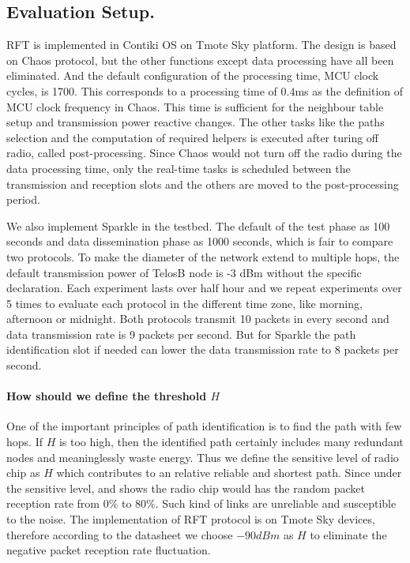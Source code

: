 \documentclass[conference]{IEEEtran}
\begin{document}
\subsection{Evaluation Setup.}
\label{sec:evaluationsetup}
RFT is implemented in Contiki OS \cite{dunkels2006contiki} on Tmote Sky platform. The design is based on Chaos protocol, but the other functions except data processing have all been eliminated. And the default configuration of the processing time, MCU clock cycles, is 1700. This corresponds to a processing time of $0.4$ms as the definition of MCU clock frequency in Chaos. This time is sufficient for the neighbour table setup and transmission power reactive changes. The other tasks like the paths selection and the computation of required helpers is executed after turing off radio, called post-processing. Since Chaos would not turn off the radio during the data processing time, only the real-time tasks is scheduled between the transmission and reception slots and the others are moved to the post-processing period.

We also implement Sparkle in the testbed. The default of the test phase as 100 seconds and data dissemination phase as 1000 seconds, which is fair to compare two protocols. To make the diameter of the network extend to multiple hops, the default transmission power of TelosB node is -3 dBm without the specific declaration. Each experiment lasts over half hour and we repeat experiments over 5 times to evaluate each protocol in the different time zone, like morning, afternoon or midnight. Both protocols transmit 10 packets in every second and data transmission rate is 9 packets per second. But for Sparkle the path identification slot if needed can lower the data transmission rate to 8 packets per second.

\paragraph{How should we define the threshold $H$}
One of the important principles of path identification is to find the path with few hops. If $H$ is too high, then the identified path certainly includes many redundant nodes and meaninglessly waste energy. Thus we define the sensitive level of radio chip as $H$ which contributes to an relative reliable and shortest path. Since under the sensitive level, \cite{srinivasan2006and} and \cite{wu2008realistic} shows the radio chip would has the random packet reception rate from $0\%$ to $80\%$. Such kind of links are unreliable and susceptible to the noise. The implementation of RFT protocol is on Tmote Sky devices, therefore according to the datasheet we choose $-90 dBm$ as $H$ to eliminate the negative packet reception rate fluctuation. 
\end{document}
